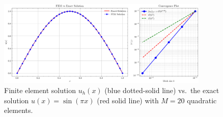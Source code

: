 \documentclass[a4paper,10pt]{article}
\begin{document}
\begin{figure}[H]
	\centering
	\includegraphics[width=0.9\textwidth]{figures/fem_plot_convergence_sine_M20.png}
	\caption{Finite element solution \(u_h(x)\) (blue dotted-solid line) vs.\ the exact
		solution \(u(x)=\sin(\pi x)\) (red solid line) with \(M=20\) quadratic elements.}
	\label{fig:solution_sine}
\end{figure}
\end{document}
